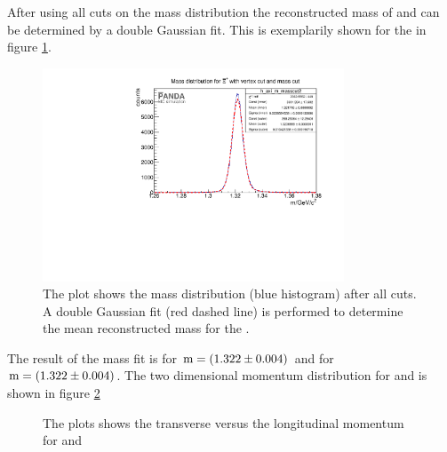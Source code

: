 		After using all cuts on the mass distribution the reconstructed mass of \cascade and \anticascade can be determined by a double Gaussian fit.
		This is exemplarily shown for the \cascade in figure \ref{fig:XiPlus_massfit}.
		
		\begin{figure}
			\centering
				\includegraphics[width=0.8\textwidth]{./plots/Xi/XiPlus_m_masscut.pdf}
			\caption{\propose The plot shows the mass distribution (blue histogram) after all cuts. 
					A double Gaussian fit (red dashed line) is performed to determine the mean reconstructed mass for the \anticascade. }
			\label{fig:XiPlus_massfit}
		\end{figure}
		The result of the mass fit is for \anticascade ${\textnormal{m} = \left( 1.322 \pm 0.004\right)}$ \massunit 
		and for \cascade \\ ${\textnormal{m} = \left( 1.322 \pm 0.004\right)}$\massunit.
		The two dimensional momentum distribution for \anticascade and \cascade is shown in figure \ref{fig:XiPlus_pt_vs_pz} 
		
		\begin{figure}
			\caption{\propose The plots shows the transverse versus the longitudinal momentum for \anticascade and \cascade}
			\label{fig:XiPlus_pt_vs_pz}
		
		\end{figure}
		

